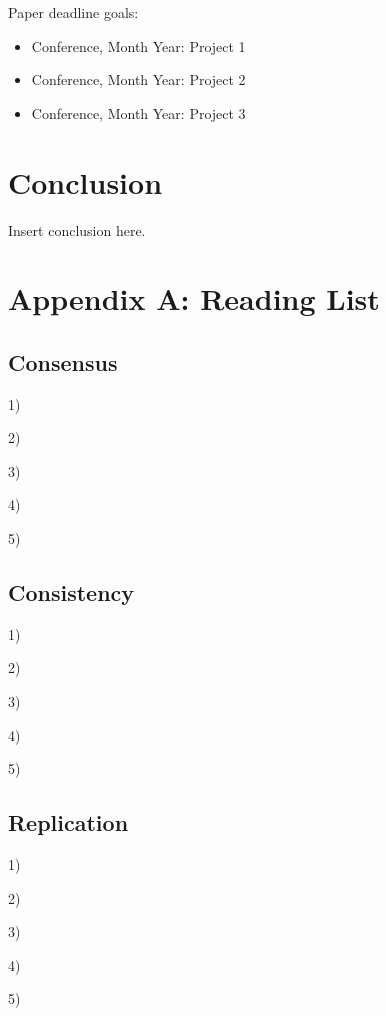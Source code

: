 \documentclass{article}
\begin{document}
Paper deadline goals:

\begin{itemize}
\item Conference, Month Year: Project 1
\item Conference, Month Year: Project 2
\item Conference, Month Year: Project 3
\end{itemize}


\section{Conclusion}

Insert conclusion here.

\newpage

\appendix
\section{Appendix A: Reading List}
\label{app:readinglist}

\subsection{Consensus}

1) 

2) 

3) 

4) 

5) 


\subsection{Consistency}

1) 

2) 

3) 

4) 

5) 


\subsection{Replication}

1) 

2) 

3) 

4) 

5) 






\newpage



\end{document}

